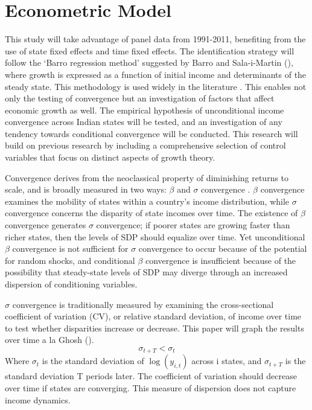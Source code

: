 \documentclass[a4paper, 11pt]{article}
\begin{document}
\section{Econometric Model}

	This study will take advantage of panel data from 1991-2011, benefiting from the use of state fixed effects and time fixed effects.  The identification strategy will follow the ‘Barro regression method’ suggested by Barro and Sala-i-Martin (\citeyear{barro_convergence_1992}), where growth is expressed as a function of initial income and determinants of the steady state.  This methodology is used widely in the literature \citep{purfield_mind_2006,baddeley_divergence_2006,kalra_growth_2010,ghosh_regional_2012,cherodian_regional_2015}.  This enables not only the testing of convergence but an investigation of factors that affect economic growth as well.  The empirical hypothesis of unconditional income convergence across Indian states will be tested, and an investigation of any tendency towards conditional convergence will be conducted.  This research will build on previous research by including a comprehensive selection of control variables that focus on distinct aspects of growth theory.\par
Convergence derives from the neoclassical property of diminishing returns to scale, and is broadly measured in two ways: $\beta$ and $\sigma$ convergence \citep{sala1996classical}.  $\beta$ convergence examines the mobility of states within a country’s income distribution, while $\sigma$ convergence concerns the disparity of state incomes over time.  The existence of $\beta$ convergence generates $\sigma$ convergence; if poorer states are growing faster than richer states, then the levels of SDP should equalize over time.  Yet unconditional $\beta$ convergence is not sufficient for $\sigma$ convergence to occur because of the potential for random shocks, and conditional $\beta$ convergence is insufficient because of the possibility that steady-state levels of SDP may diverge through an increased dispersion of conditioning variables. \par   
$\sigma$ convergence is traditionally measured by examining the cross-sectional coefficient of variation (CV), or relative standard deviation, of income over time to test whether disparities increase or decrease.  This paper will graph the results over time a la Ghosh (\citeyear{ghosh_economic_2008}). 
$$ \sigma_{t+T} < \sigma_t$$
Where $\sigma_t$ is the standard deviation of $\log(y_{i,t})$ across i states, and $\sigma_{t+T}$ is the standard deviation T periods later.  The coefficient of variation should decrease over time if states are converging.  This measure of dispersion does not capture income dynamics.\par
\end{document}
